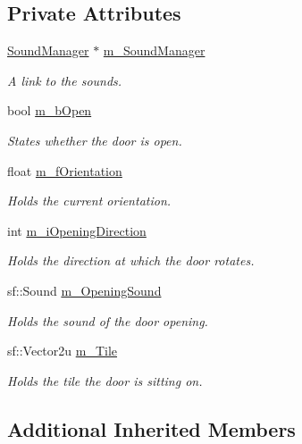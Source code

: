 \subsection*{Private Attributes}
\begin{DoxyCompactItemize}
\item 
\hyperlink{class_sound_manager}{Sound\+Manager} $\ast$ \hyperlink{class_entrance_aeef1bb9f20ecef276dddaaa2a9bc5938}{m\+\_\+\+Sound\+Manager}
\begin{DoxyCompactList}\small\item\em A link to the sounds. \end{DoxyCompactList}\item 
bool \hyperlink{class_entrance_af155609311931998d9d71fd899f49fe8}{m\+\_\+b\+Open}
\begin{DoxyCompactList}\small\item\em States whether the door is open. \end{DoxyCompactList}\item 
float \hyperlink{class_entrance_a78912e4f4ab6eddc3ebec5fb1c1a0a99}{m\+\_\+f\+Orientation}
\begin{DoxyCompactList}\small\item\em Holds the current orientation. \end{DoxyCompactList}\item 
int \hyperlink{class_entrance_a1b0e28653b1e9ad29e7783c60417a882}{m\+\_\+i\+Opening\+Direction}
\begin{DoxyCompactList}\small\item\em Holds the direction at which the door rotates. \end{DoxyCompactList}\item 
sf\+::\+Sound \hyperlink{class_entrance_a16a31a66ec5bc1e6f8c777749f06e03a}{m\+\_\+\+Opening\+Sound}
\begin{DoxyCompactList}\small\item\em Holds the sound of the door opening. \end{DoxyCompactList}\item 
sf\+::\+Vector2u \hyperlink{class_entrance_afdedd2f9348968422d822e544abaae98}{m\+\_\+\+Tile}
\begin{DoxyCompactList}\small\item\em Holds the tile the door is sitting on. \end{DoxyCompactList}\end{DoxyCompactItemize}
\subsection*{Additional Inherited Members}


